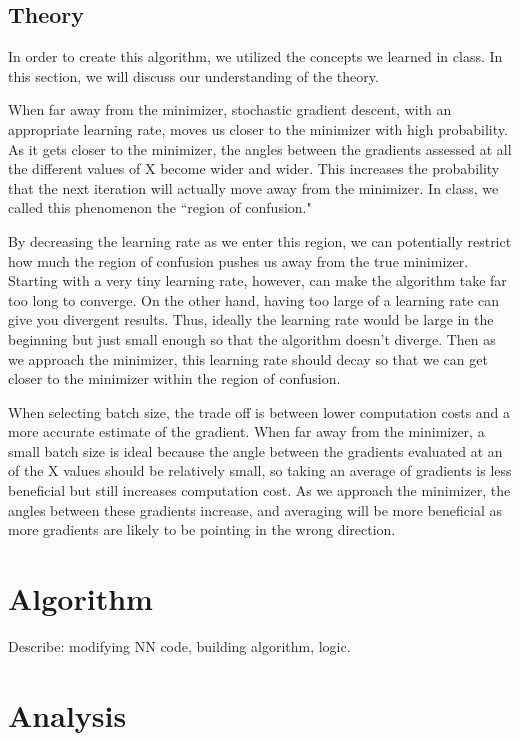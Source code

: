 \documentclass{article}
\begin{document}
\subsection*{Theory}
\par In order to create this algorithm, we utilized the concepts we learned in class. In this section, we will discuss our understanding of the theory. 
\par When far away from the minimizer, stochastic gradient descent, with an appropriate learning rate, moves us closer to the minimizer with high probability. As it gets closer to the minimizer, the angles between the gradients assessed at all the different values of X become wider and wider. This increases the probability that the next iteration will actually move away from the minimizer. In class, we called this phenomenon the ``region of confusion." 
\par By decreasing the learning rate as we enter this region, we can potentially restrict how much the region of confusion pushes us away from the true minimizer. Starting with a very tiny learning rate, however, can make the algorithm take far too long to converge. On the other hand, having too large of a learning rate can give you divergent results. Thus, ideally the learning rate would be large in the beginning but just small enough so that the algorithm doesn't diverge. Then as we approach the minimizer, this learning rate should decay so that we can get closer to the minimizer within the region of confusion. 
\par When selecting batch size, the trade off is between lower computation costs and a more accurate estimate of the gradient. When far away from the minimizer, a small batch size is ideal because the angle between the gradients evaluated at an of the X values should be relatively small, so taking an average of gradients is less beneficial but still increases computation cost. As we approach the minimizer, the angles between these gradients increase, and averaging will be more beneficial as more gradients are likely to be pointing in the wrong direction. 

\section*{Algorithm}
Describe: modifying NN code, building algorithm, logic. 

\section*{Analysis}
\end{document}
